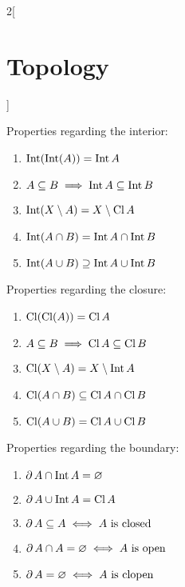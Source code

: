 \documentclass[../../../main.tex]{subfiles}
\begin{document}
\begin{multicols}{2}[\section{Topology}]
\begin{prop}
    Properties regarding the interior:
    \begin{enumerate}[leftmargin=1.15cm]\renewcommand{\labelenumi}{1.\arabic{enumi}.}
      \item $\operatorname{Int}(\operatorname{Int} (A))=         \operatorname{Int} A$
      \item $A\subseteq B\implies    \operatorname{Int} A\subseteq\operatorname{Int} B$
      \item $\operatorname{Int}(X\setminus A)=     X\setminus \operatorname{Cl} A$
      \item $\operatorname{Int}(A\cap B)=          \operatorname{Int} A\cap\operatorname{Int} B$
      \item $\operatorname{Int}(A\cup B)\supseteq  \operatorname{Int} A\cup\operatorname{Int} B$
    \end{enumerate}
    Properties regarding the closure:
    \begin{enumerate}[leftmargin=1.15cm]\renewcommand{\labelenumi}{2.\arabic{enumi}.}
      \item $\operatorname{Cl}(\operatorname{Cl} (A))=          \operatorname{Cl} A$
      \item $A\subseteq B\implies   \operatorname{Cl} A\subseteq\operatorname{Cl} B$
      \item $\operatorname{Cl}(X\setminus A)=     X\setminus \operatorname{Int} A$
      \item $\operatorname{Cl}(A\cap B)\subseteq  \operatorname{Cl} A\cap\operatorname{Cl} B$
      \item $\operatorname{Cl}(A\cup B)=          \operatorname{Cl} A\cup\operatorname{Cl} B$
    \end{enumerate}
    Properties regarding the boundary:
    \begin{enumerate}[leftmargin=1.15cm]\renewcommand{\labelenumi}{3.\arabic{enumi}.}
      \item $\operatorname{\partial} A\cap\operatorname{Int} A=         \varnothing$
      \item $\operatorname{\partial} A\cup\operatorname{Int} A=             \operatorname{Cl} A$
      \item $\operatorname{\partial} A\subseteq A\iff  A  \text{ is closed}$
      \item $\operatorname{\partial} A\cap A=\varnothing\iff  A\text{ is open}$
      \item $\operatorname{\partial} A=\varnothing\iff\text{$A$ is clopen}$
    \end{enumerate}
  \end{prop}

\end{multicols}
\end{document}
